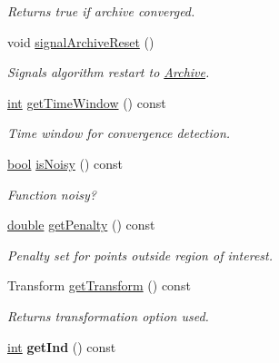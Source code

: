 \begin{DoxyCompactItemize}
\begin{DoxyCompactList}\small\item\em Returns true if archive converged. \end{DoxyCompactList}\item 
void \hyperlink{classCOCOfunc_aa05f6328202055ad1775bfc702138d57}{signal\+Archive\+Reset} ()\hypertarget{classCOCOfunc_aa05f6328202055ad1775bfc702138d57}{}\label{classCOCOfunc_aa05f6328202055ad1775bfc702138d57}

\begin{DoxyCompactList}\small\item\em Signals algorithm restart to \hyperlink{classArchive}{Archive}. \end{DoxyCompactList}\item 
\hyperlink{classint}{int} \hyperlink{classCOCOfunc_a564ba29a6578acbf448b6d4637dba5e6}{get\+Time\+Window} () const \hypertarget{classCOCOfunc_a564ba29a6578acbf448b6d4637dba5e6}{}\label{classCOCOfunc_a564ba29a6578acbf448b6d4637dba5e6}

\begin{DoxyCompactList}\small\item\em Time window for convergence detection. \end{DoxyCompactList}\item 
\hyperlink{classbool}{bool} \hyperlink{classCOCOfunc_aebf2679b94c68a5dd00bfbe2e65ae03c}{is\+Noisy} () const \hypertarget{classCOCOfunc_aebf2679b94c68a5dd00bfbe2e65ae03c}{}\label{classCOCOfunc_aebf2679b94c68a5dd00bfbe2e65ae03c}

\begin{DoxyCompactList}\small\item\em Function noisy? \end{DoxyCompactList}\item 
\hyperlink{classdouble}{double} \hyperlink{classCOCOfunc_a1bca22ed36ffb8b1e1a3c3ba6d28474a}{get\+Penalty} () const \hypertarget{classCOCOfunc_a1bca22ed36ffb8b1e1a3c3ba6d28474a}{}\label{classCOCOfunc_a1bca22ed36ffb8b1e1a3c3ba6d28474a}

\begin{DoxyCompactList}\small\item\em Penalty set for points outside region of interest. \end{DoxyCompactList}\item 
Transform \hyperlink{classCOCOfunc_a45ba191b9c22159ef160c56b7bb84e47}{get\+Transform} () const \hypertarget{classCOCOfunc_a45ba191b9c22159ef160c56b7bb84e47}{}\label{classCOCOfunc_a45ba191b9c22159ef160c56b7bb84e47}

\begin{DoxyCompactList}\small\item\em Returns transformation option used. \end{DoxyCompactList}\item 
\hyperlink{classint}{int} {\bfseries get\+Ind} () const \hypertarget{classCOCOfunc_adcc87a3ee718a74a2fbb715501a2592e}{}\label{classCOCOfunc_adcc87a3ee718a74a2fbb715501a2592e}

\end{DoxyCompactItemize}
